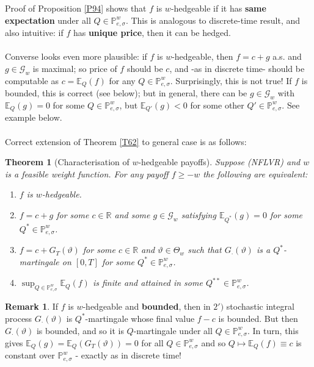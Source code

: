 \documentclass[12pt,a4paper, twoside]{article}
\newtheorem{thm}{Theorem}[section]
\theoremstyle{definition}
\newtheorem{rem}{Remark}[section]
\newcommand{\EE}{\mathbb{E}} %
\newcommand{\PP}{\mathbb{P}} %
\begin{document}
\newpage
Proof of Proposition \ref{P94} shows that $f$ is $w$-hedgeable if it has \textbf{same expectation} under all $Q \in \PP_{e, \sigma}^w$. This is analogous to discrete-time result, and also intuitive: if $f$ has \textbf{unique price}, then it can be hedged. \\\\
Converse looks even more plausible: if $f$ is $w$-hedgeable, then $f=c+g$ a.s. and $g \in \mathcal{G}_w$ is maximal; so price of $f$ should be $c$, and -as in discrete time- should be computable as $c= \EE_Q(f)$ for any $Q \in \PP_{e, \sigma}^w$. Surprisingly, this is not true! If $f$ is bounded, this is correct (see below); but in general, there can be $g \in \mathcal{G}_w$ with $\EE_Q(g)=0$ for some $Q \in \PP_{e, \sigma}^w$, but $\EE_{Q'}(g) <0$ for some other $Q' \in \PP_{e, \sigma}^w$. See example below. \\
\\
Correct extension of Theorem \ref{T62} to general case is as follows:  
\begin{thm}[Characterisation of $w$-hedgeable payoffs] \label{T95} Suppose (NFLVR) and $w$ is a feasible weight function. For any payoff $f \geq -w$ the following are equivalent:
\begin{enumerate}
\item $f$ is $w$-hedgeable.
\item $f=c+g$ for some $c \in \mathbb{R}$ and some $g \in \mathcal{G}_w$ satisfying $\EE_{Q^*} (g)=0$ for some $Q^* \in \PP_{e, \sigma}^w$. 
\item[2'.] $f=c+ G_T( \vartheta)$ for some $c \in \mathbb{R}$ and $\vartheta \in \Theta_w$ such that $G_\cdot( \vartheta)$ is a $Q^*$-martingale on $[0,T]$ for some $Q^* \in \PP_{e, \sigma}^w$. 
\item $\sup_{Q \in \PP_{e, \sigma}^w} \EE_Q(f)$ is finite and attained in some $Q^{**} \in \PP_{e, \sigma}^w$. 
\end{enumerate}
\end{thm}
\begin{rem} If $f$ is $w$-hedgeable and \textbf{bounded}, then in $2')$ stochastic integral process $G_\cdot( \vartheta)$ is $Q^*$-martingale whose final value $f-c$ is bounded. But then $G_\cdot ( \vartheta)$ is bounded, and so it is $Q$-martingale under all $Q \in \PP_{e, \sigma}^w$. In turn, this gives $\EE_Q(g) = \EE_Q(G_T(\vartheta))=0$ for all $Q \in \PP_{e, \sigma}^w$ and so $Q \mapsto \EE_Q(f) \equiv c$ is constant over $\PP_{e, \sigma}^w$ - exactly as in discrete time! 
\end{rem}
\end{document}
